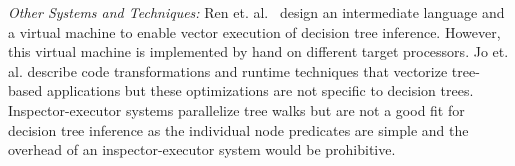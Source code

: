 \emph{Other Systems and Techniques:} Ren et. al.~\cite{PortableVM} design an
intermediate language and a virtual machine to enable vector execution of decision tree
inference. However, this virtual machine is implemented by 
hand on different target processors.
Jo et. al.\cite{MilindTreeVectorization} describe code transformations and runtime 
techniques that vectorize tree-based applications but these 
optimizations are not specific to decision trees.
Inspector-executor systems \cite{TaoOfParallelism,HybridCPUGPU}  
parallelize tree walks but are not a good fit 
for decision tree inference as the individual node predicates are 
simple and the overhead of an inspector-executor system would be prohibitive.

